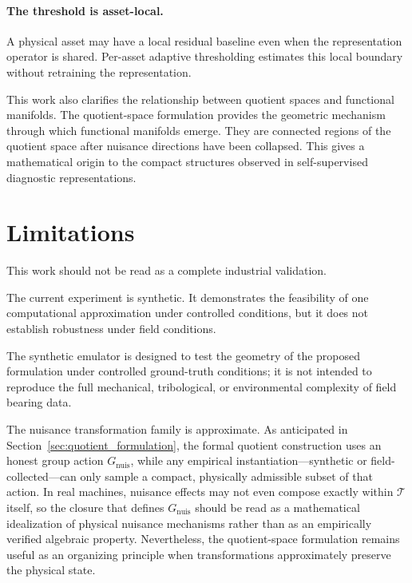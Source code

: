 \documentclass[11pt,letterpaper]{article}
\newcommand{\Gnuis}{\ensuremath{G_{\mathrm{nuis}}}}
\begin{document}
\paragraph{The threshold is asset-local.}
A physical asset may have a local residual baseline even when the representation operator is shared.
Per-asset adaptive thresholding estimates this local boundary without retraining the representation.

This work also clarifies the relationship between quotient spaces and functional manifolds.
The quotient-space formulation provides the geometric mechanism through which functional manifolds emerge.
They are connected regions of the quotient space after nuisance directions have been collapsed.
This gives a mathematical origin to the compact structures observed in self-supervised diagnostic representations.

\section{Limitations}

This work should not be read as a complete industrial validation.

The current experiment is synthetic.
It demonstrates the feasibility of one computational approximation under controlled conditions, but it does not establish robustness under field conditions.

The synthetic emulator is designed to test the geometry of the proposed formulation under controlled ground-truth conditions; it is not intended to reproduce the full mechanical, tribological, or environmental complexity of field bearing data.

The nuisance transformation family is approximate.
As anticipated in Section~\ref{sec:quotient_formulation}, the formal quotient construction uses an honest group action \(\Gnuis\), while any empirical instantiation---synthetic or field-collected---can only sample a compact, physically admissible subset of that action.
In real machines, nuisance effects may not even compose exactly within \(\mathcal{T}\) itself, so the closure that defines \(\Gnuis\) should be read as a mathematical idealization of physical nuisance mechanisms rather than as an empirically verified algebraic property.
Nevertheless, the quotient-space formulation remains useful as an organizing principle when transformations approximately preserve the physical state.
\end{document}
